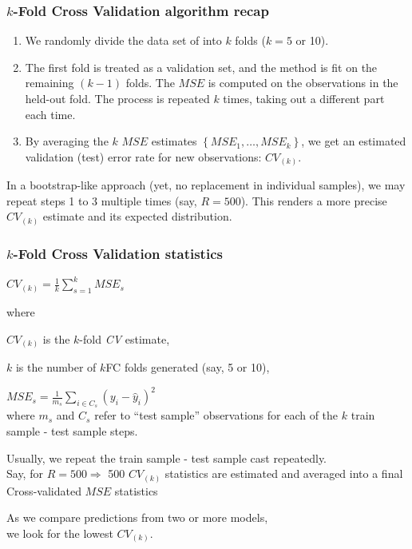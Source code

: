 \documentclass{beamer}
\begin{document}


\begin{frame}
\frametitle{$k$-Fold Cross Validation algorithm recap}

\begin{enumerate}
  \item We randomly divide the data set of into $k$ folds ($k = 5$ or 10).
  \vspace{0.2cm}
  \item The first fold is treated as a validation set, and the method is fit on the remaining $(k-1)$ folds. The $\textit{MSE}$ is computed on the observations in the held-out fold. The process is repeated $k$ times, taking out a different part each time.
   \vspace{0.2cm}
  \item By averaging the $k$  $\textit{MSE}$  estimates $\left\lbrace \textit{MSE}_1 , \dots, \textit{MSE}_k \right\rbrace$, we get an estimated validation (test) error rate for new observations: $\textit{CV}_{(k)}$.
\end{enumerate}
\vspace{0.5cm}
In a bootstrap-like approach (yet, no replacement in individual samples), we may repeat steps 1 to 3 multiple times (say, $R=500$). This renders a more precise $\textit{CV}_{(k)}$ estimate and its expected distribution.

\end{frame}



\begin{frame}
\frametitle{$k$-Fold Cross Validation statistics}


$ \textit{CV}_{(k)}= \frac{1}{k}\displaystyle\sum_{s=1}^{k} \textit{MSE}_s $
\vspace{0.3cm}

\begin{labeling}{where}
\item [where] $\textit{CV}_{(k)}$ is the $k$-fold \textit{CV} estimate,
\item [ ] $k$ is the number of $k$FC folds generated (say, 5 or 10),
\item [ ] $\textit{MSE}_s = \frac{1}{m_s} \sum_{i \in C_s}^{}(y_i - \widehat{y}_i)^2 $ \\ where $m_s$ and $C_s$ refer to ``test sample'' observations for each of the $k$ train sample - test sample steps.
\end{labeling}
\vspace{0.3cm}

Usually, we repeat the train sample - test sample cast repeatedly.\\ Say, for $R=500 \Rightarrow$ 500 $\textit{CV}_{(k)}$ statistics are estimated and averaged into a final Cross-validated $\textit{MSE}$ statistics
\vspace{0.3cm}

As we compare predictions from two or more models, 
\\we look for the lowest $\textit{CV}_{(k)}$. 


\end{frame}
\end{document}
